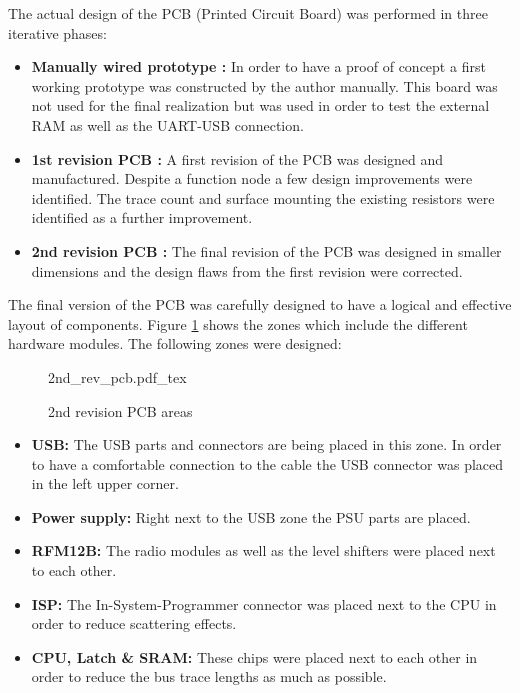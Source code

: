 The actual design of the PCB (Printed Circuit Board) was performed in three iterative phases:
\begin{itemize}
    \item \textbf{Manually wired prototype :} In order to have a proof of concept a first working prototype was constructed by the author manually. This board was not used for the final realization but was used in order to test the external RAM as well as the UART-USB connection.
    \item \textbf{1st revision PCB :} A first revision of the PCB was designed and manufactured. Despite a function node a few design improvements were identified. The trace count and surface mounting the existing resistors were identified as a further improvement.
    \item \textbf{2nd revision PCB :} The final revision of the PCB was designed in smaller dimensions and the design flaws from the first revision were corrected.
\end{itemize}

The final version of the PCB was carefully designed to have a logical and effective layout of components. Figure \ref{fig:2ndrev_pcb} shows the zones which include the different hardware modules. The following zones were designed:

\begin{figure}[H]
    \centering
    {2nd_rev_pcb.pdf_tex}
    \caption{2nd revision PCB areas}
    \label{fig:2ndrev_pcb}
\end{figure}

\begin{itemize}
    \item \textbf{USB: } The USB parts and connectors are being placed in this zone. In order to have a comfortable connection to the cable the USB connector was placed in the left upper corner.
    \item \textbf{Power supply: } Right next to the USB zone the PSU parts are placed.
    \item \textbf{RFM12B: } The radio modules as well as the level shifters were placed next to each other.
    \item \textbf{ISP: } The In-System-Programmer connector was placed next to the CPU in order to reduce scattering effects.
    \item \textbf{CPU, Latch \& SRAM: } These chips were placed next to each other in order to reduce the bus trace lengths as much as possible.
\end{itemize}

